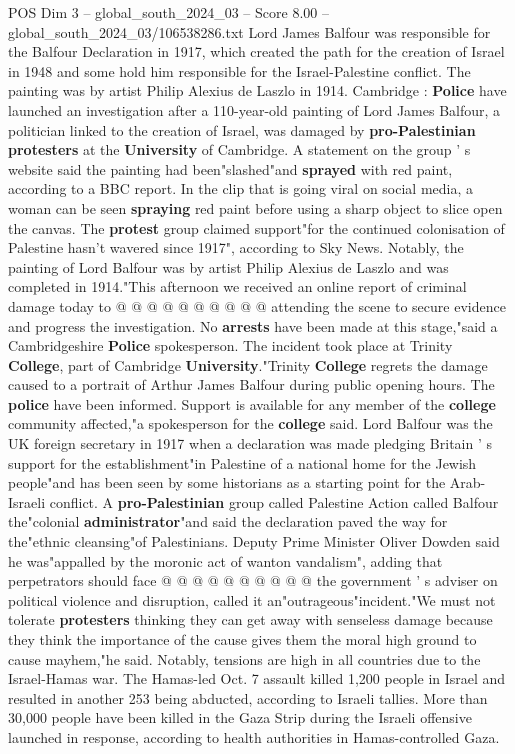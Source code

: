 \begin{textsample}{POS Dim 3 – global\_south\_2024\_03 – Score 8.00 – global\_south\_2024\_03/106538286.txt}  \label{ex:f3_pos_411}
Lord James Balfour was responsible for the Balfour Declaration in 1917, which created the path for the creation of Israel in 1948 and some hold him responsible for the Israel-Palestine conflict.
The painting was by artist Philip Alexius de Laszlo in 1914.
Cambridge : \textbf{Police} have launched an investigation after a 110-year-old painting of Lord James Balfour, a politician linked to the creation of Israel, was damaged by \textbf{pro-Palestinian} \textbf{protesters} at the \textbf{University} of Cambridge.
A statement on the group ' s website said the painting had been"slashed"and \textbf{sprayed} with red paint, according to a BBC report.
In the clip that is going viral on social media, a woman can be seen \textbf{spraying} red paint before using a sharp object to slice open the canvas.
The \textbf{protest} group claimed support"for the continued colonisation of Palestine hasn't wavered since 1917", according to Sky News.
Notably, the painting of Lord Balfour was by artist Philip Alexius de Laszlo and was completed in 1914."This afternoon we received an online report of criminal damage today to @ @ @ @ @ @ @ @ @ @ attending the scene to secure evidence and progress the investigation.
No \textbf{arrests} have been made at this stage,"said a Cambridgeshire \textbf{Police} spokesperson.
The incident took place at Trinity \textbf{College}, part of Cambridge \textbf{University}."Trinity \textbf{College} regrets the damage caused to a portrait of Arthur James Balfour during public opening hours.
The \textbf{police} have been informed.
Support is available for any member of the \textbf{college} community affected,"a spokesperson for the \textbf{college} said.
Lord Balfour was the UK foreign secretary in 1917 when a declaration was made pledging Britain ' s support for the establishment"in Palestine of a national home for the Jewish people"and has been seen by some historians as a starting point for the Arab-Israeli conflict.
A \textbf{pro-Palestinian} group called Palestine Action called Balfour the"colonial \textbf{administrator}"and said the declaration paved the way for the"ethnic cleansing"of Palestinians.
Deputy Prime Minister Oliver Dowden said he was"appalled by the moronic act of wanton vandalism", adding that perpetrators should face @ @ @ @ @ @ @ @ @ @ the government ' s adviser on political violence and disruption, called it an"outrageous"incident."We must not tolerate \textbf{protesters} thinking they can get away with senseless damage because they think the importance of the cause gives them the moral high ground to cause mayhem,"he said.
Notably, tensions are high in all countries due to the Israel-Hamas war.
The Hamas-led Oct. 7 assault killed 1,200 people in Israel and resulted in another 253 being abducted, according to Israeli tallies.
More than 30,000 people have been killed in the Gaza Strip during the Israeli offensive launched in response, according to health authorities in Hamas-controlled Gaza.

\end{textsample}
